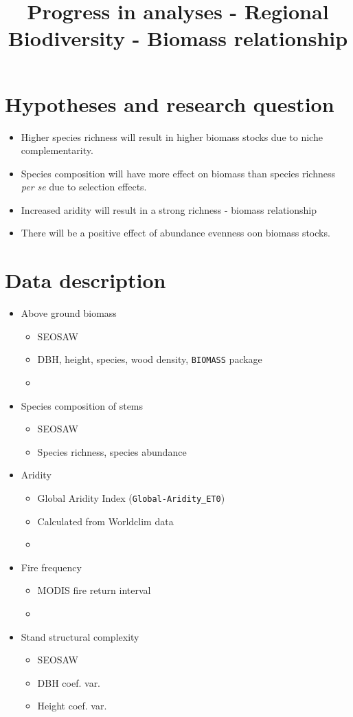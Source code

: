 \documentclass{article}
\title{\vspace{-1cm}Progress in analyses - Regional Biodiversity - Biomass relationship}
\date{}
\begin{document}
\maketitle{}

\section{Hypotheses and research question}

\begin{itemize}
	\item{Higher species richness will result in higher biomass stocks due to niche complementarity.}
	\item{Species composition will have more effect on biomass than species richness \textit{per se} due to selection effects.}
	\item{Increased aridity will result in a strong richness - biomass relationship}
	\item{There will be a positive effect of abundance evenness oon biomass stocks.}
\end{itemize}

\section{Data description}

\begin{itemize}
	\item{Above ground biomass}
		\begin{itemize}
			\item{SEOSAW} 
			\item{DBH, height, species, wood density, \verb|BIOMASS| package}
			\item{\citet{SEOSAW}}
		\end{itemize}
	\item{Species composition of stems}
		\begin{itemize}
			\item{SEOSAW}
			\item{Species richness, species abundance}
		\end{itemize}
	\item{Aridity}
		\begin{itemize}
			\item{Global Aridity Index (\verb|Global-Aridity_ET0|)}
			\item{Calculated from Worldclim data}
			\item{\citet{Trabucco2009}}
		\end{itemize}
	\item{Fire frequency}
		\begin{itemize}
			\item{MODIS fire return interval}
			\item{\citet{}}
		\end{itemize}
	\item{Stand structural complexity}
		\begin{itemize}
			\item{SEOSAW}
			\item{DBH coef. var.}
			\item{Height coef. var.}
		\end{itemize}
\end{itemize}
\end{document}
